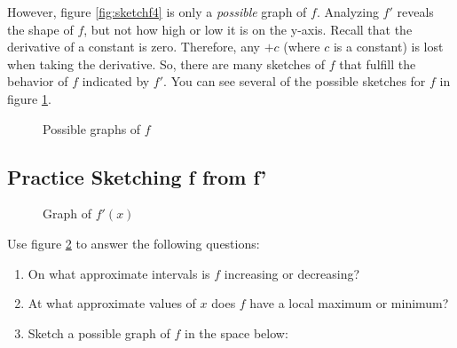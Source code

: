 However, figure \ref{fig:sketchf4} is only a \textit{possible} graph of $f$. Analyzing $f'$ reveals the shape of $f$, but not how high or low it is on the y-axis. Recall that the derivative of a constant is zero. Therefore, any $+c$ (where $c$ is a constant) is lost when taking the derivative. So, there are many sketches of $f$ that fulfill the behavior of $f$ indicated by $f'$. You can see several of the possible sketches for $f$ in figure \ref{fig:sketchf5}. 

\begin{figure}[htbp]
	\centering
	\caption{Possible graphs of $f$}
	\label{fig:sketchf5}
\end{figure}

\subsection{Practice Sketching f from f'}
\begin{figure}[htbp]
	\centering
	\caption{Graph of $f'(x)$}
	\label{fig:sketchex}
\end{figure}


\begin{Exercise}[label=sketch1]
Use figure \ref{fig:sketchex} to answer the following questions:
\begin{enumerate}
\item On what approximate intervals is $f$ increasing or decreasing?
\item At what approximate values of $x$ does $f$ have a local maximum or minimum?
\item Sketch a possible graph of $f$ in the space below:
\end{enumerate}
\end{Exercise}

